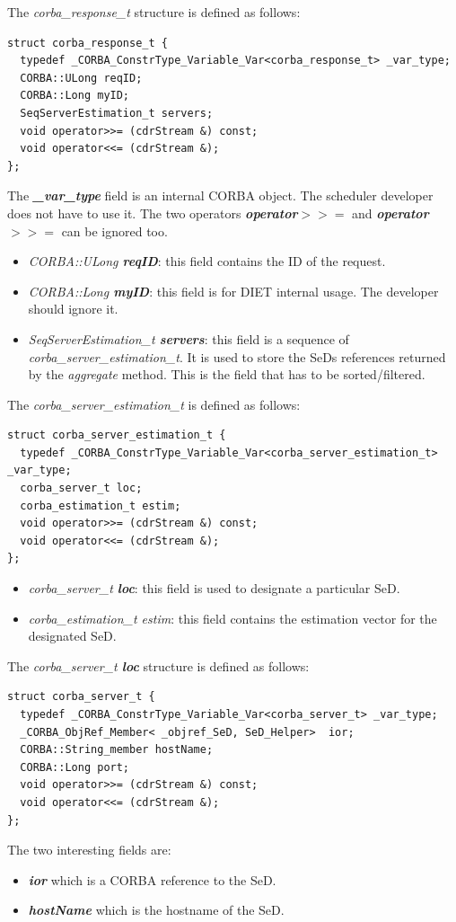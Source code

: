 \noindent The \textit{corba\_response\_t} structure is defined as follows:
\begin{verbatim}
struct corba_response_t {
  typedef _CORBA_ConstrType_Variable_Var<corba_response_t> _var_type;  
  CORBA::ULong reqID;
  CORBA::Long myID;
  SeqServerEstimation_t servers;
  void operator>>= (cdrStream &) const;
  void operator<<= (cdrStream &);
};
\end{verbatim}

\noindent The \textit{\bf \_var\_type} field is an internal CORBA object. The
scheduler developer does not have to use it. The two operators
\textit{\bf operator$>>=$} and \textit{\bf operator$>>=$} can be ignored too.
\begin{itemize}
  \item \textit{CORBA::ULong \bf reqID}: this field contains the ID of the
    request.
  \item \textit{CORBA::Long \bf myID}: this field is for DIET internal usage.
    The developer should ignore it.
  \item \textit{SeqServerEstimation\_t \bf servers}: this field is a sequence
    of \textit{corba\_server\_estimation\_t}. It is used to store the SeDs
    references returned by the \textit{aggregate} method. This is the field
    that has to be sorted/filtered.
\end{itemize}

\noindent The \textit{corba\_server\_estimation\_t} is defined as follows:
\begin{verbatim}
struct corba_server_estimation_t {
  typedef _CORBA_ConstrType_Variable_Var<corba_server_estimation_t> _var_type;
  corba_server_t loc;
  corba_estimation_t estim;
  void operator>>= (cdrStream &) const;
  void operator<<= (cdrStream &);
};
\end{verbatim}
\begin{itemize}
  \item \textit{corba\_server\_t \bf loc}: this field is used to designate a
    particular SeD.
  \item \textit{corba\_estimation\_t estim}: this field contains the estimation
    vector for the designated SeD.
\end{itemize}

\noindent The \textit{corba\_server\_t \bf loc} structure is defined as
follows:
\begin{verbatim}
struct corba_server_t {
  typedef _CORBA_ConstrType_Variable_Var<corba_server_t> _var_type;  
  _CORBA_ObjRef_Member< _objref_SeD, SeD_Helper>  ior;
  CORBA::String_member hostName;
  CORBA::Long port;
  void operator>>= (cdrStream &) const;
  void operator<<= (cdrStream &);
};
\end{verbatim}
The two interesting fields are:
\begin{itemize}
  \item \textit{\bf ior} which is a CORBA reference to the SeD.
  \item \textit{\bf hostName} which is the hostname of the SeD.
\end{itemize}

